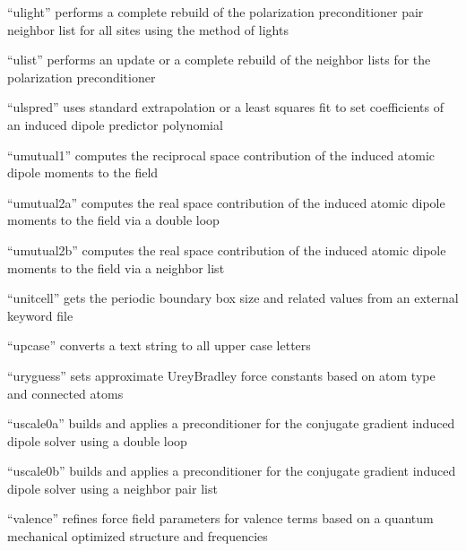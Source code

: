 \documentclass[letterpaper,11pt,english]{sphinxmanual}
\begin{document}
“ulight” performs a complete rebuild of the polarization
preconditioner pair neighbor list for all sites using the
method of lights


“ulist” performs an update or a complete rebuild of the
neighbor lists for the polarization preconditioner


“ulspred” uses standard extrapolation or a least squares fit
to set coefficients of an induced dipole predictor polynomial


“umutual1” computes the reciprocal space contribution of the
induced atomic dipole moments to the field


“umutual2a” computes the real space contribution of the induced
atomic dipole moments to the field via a double loop


“umutual2b” computes the real space contribution of the induced
atomic dipole moments to the field via a neighbor list


“unitcell” gets the periodic boundary box size and related
values from an external keyword file


“upcase” converts a text string to all upper case letters


“uryguess” sets approximate Urey\sphinxhyphen{}Bradley force constants
based on atom type and connected atoms


“uscale0a” builds and applies a preconditioner for the conjugate
gradient induced dipole solver using a double loop


“uscale0b” builds and applies a preconditioner for the conjugate
gradient induced dipole solver using a neighbor pair list


“valence” refines force field parameters for valence terms based
on a quantum mechanical optimized structure and frequencies
\end{document}
